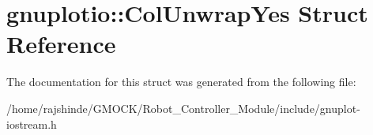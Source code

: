 \hypertarget{structgnuplotio_1_1_col_unwrap_yes}{}\section{gnuplotio\+:\+:Col\+Unwrap\+Yes Struct Reference}
\label{structgnuplotio_1_1_col_unwrap_yes}


The documentation for this struct was generated from the following file\+:\begin{DoxyCompactItemize}
\item 
/home/rajshinde/\+G\+M\+O\+C\+K/\+Robot\+\_\+\+Controller\+\_\+\+Module/include/gnuplot-\/iostream.\+h\end{DoxyCompactItemize}
